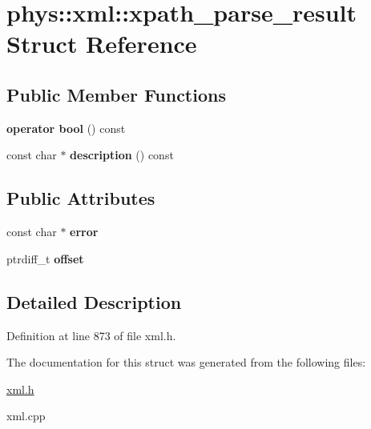 \hypertarget{structphys_1_1xml_1_1xpath__parse__result}{
\section{phys::xml::xpath\_\-parse\_\-result Struct Reference}
\label{d3/d82/structphys_1_1xml_1_1xpath__parse__result}
}
\subsection*{Public Member Functions}
\begin{DoxyCompactItemize}
\item 
\hypertarget{structphys_1_1xml_1_1xpath__parse__result_a6dcc7705327a53c40d27951f1fa135e8}{
{\bfseries operator bool} () const }
\label{d3/d82/structphys_1_1xml_1_1xpath__parse__result_a6dcc7705327a53c40d27951f1fa135e8}

\item 
\hypertarget{structphys_1_1xml_1_1xpath__parse__result_ad4a6c1b6f5b15a51f363eb1ba80ba328}{
const char $\ast$ {\bfseries description} () const }
\label{d3/d82/structphys_1_1xml_1_1xpath__parse__result_ad4a6c1b6f5b15a51f363eb1ba80ba328}

\end{DoxyCompactItemize}
\subsection*{Public Attributes}
\begin{DoxyCompactItemize}
\item 
\hypertarget{structphys_1_1xml_1_1xpath__parse__result_aa22bdd4bda9b88bf8fabfe0a6da3f0f8}{
const char $\ast$ {\bfseries error}}
\label{d3/d82/structphys_1_1xml_1_1xpath__parse__result_aa22bdd4bda9b88bf8fabfe0a6da3f0f8}

\item 
\hypertarget{structphys_1_1xml_1_1xpath__parse__result_a56213a26c0e24a7f2d1212ff6095bc51}{
ptrdiff\_\-t {\bfseries offset}}
\label{d3/d82/structphys_1_1xml_1_1xpath__parse__result_a56213a26c0e24a7f2d1212ff6095bc51}

\end{DoxyCompactItemize}


\subsection{Detailed Description}


Definition at line 873 of file xml.h.



The documentation for this struct was generated from the following files:\begin{DoxyCompactItemize}
\item 
\hyperlink{xml_8h}{xml.h}\item 
xml.cpp\end{DoxyCompactItemize}
